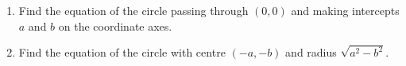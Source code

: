 \begin{enumerate}[label=\thesubsection.\arabic*,ref=\thesubsection.\theenumi]
  \item Find the equation of the circle passing through $(0,0)$ and making intercepts $a$ and $b$ on the coordinate axes.
 \item Find the equation of the circle with 
centre $(-a,-b)$ and radius $\sqrt{a^{2}-b^{2}}$.
	 \\
		\solution
\label{chapters/11/11/1/5}
%
\end{enumerate}
